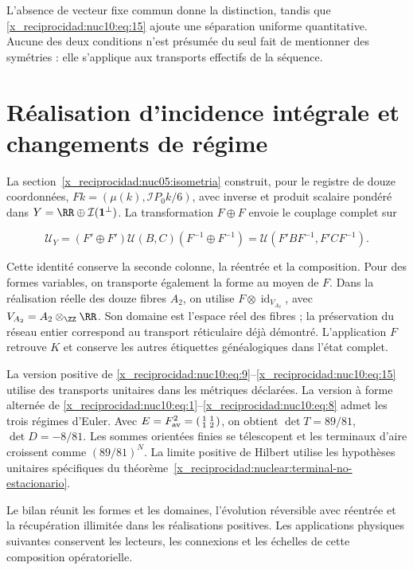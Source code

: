 L’absence de vecteur fixe commun donne la distinction, tandis que \eqref{x_reciprocidad:nuc10:eq:15} ajoute une séparation uniforme quantitative. Aucune des deux conditions n’est présumée du seul fait de mentionner des symétries : elle s’applique aux transports effectifs de la séquence.

\section{Réalisation d’incidence intégrale et changements de régime}

La section~\ref{x_reciprocidad:nuc05:isometria} construit, pour le registre de douze
coordonnées, \(Fk=(\mu(k),\mathcal IP_0k/6)\), avec inverse et
produit scalaire pondéré dans \(Y=\RR\oplus\mathcal I(\mathbf1^\perp)\).
La transformation \(F\oplus F\) envoie le couplage complet sur



\begin{equation}
\mathcal U_Y=(F'\oplus F')\mathcal U(B,C)(F^{-1}\oplus F^{-1})
=\mathcal U(F'BF^{-1},F'CF^{-1}).
\label{x_reciprocidad:nuc10:eq:16}
\end{equation}



Cette identité conserve la seconde colonne, la réentrée et la composition.
Pour des formes variables, on transporte également la forme au moyen de \(F\).
Dans la réalisation réelle des douze fibres \(A_2\), on utilise
\(F\otimes\operatorname{id}_{V_{A_2}}\), avec
\(V_{A_2}=A_2\otimes_{\ZZ}\RR\). Son domaine est l’espace réel des
fibres ; la préservation du réseau entier correspond au transport
réticulaire déjà démontré. L’application \(F\) retrouve \(K\) et
conserve les autres étiquettes généalogiques dans l’état complet.

La version positive de \eqref{x_reciprocidad:nuc10:eq:9}–\eqref{x_reciprocidad:nuc10:eq:15} utilise des transports unitaires dans les
métriques déclarées. La version à forme alternée de \eqref{x_reciprocidad:nuc10:eq:1}–\eqref{x_reciprocidad:nuc10:eq:8} admet
les trois régimes d’Euler. Avec
\(E=F_{\rm av}^2=\left(\begin{smallmatrix}1&1\\1&2\end{smallmatrix}\right)\),
on obtient \(\det T=89/81\), \(\det D=-8/81\). Les sommes
orientées finies se télescopent et les terminaux d’aire croissent comme
\((89/81)^N\). La limite positive de Hilbert utilise les hypothèses
unitaires spécifiques du théorème~\ref{x_reciprocidad:nuclear:terminal-no-estacionario}.

Le bilan réunit les formes et les domaines, l’évolution réversible avec réentrée
et la récupération illimitée dans les réalisations positives. Les
applications physiques suivantes conservent les lecteurs, les connexions et les
échelles de cette composition opératorielle.
